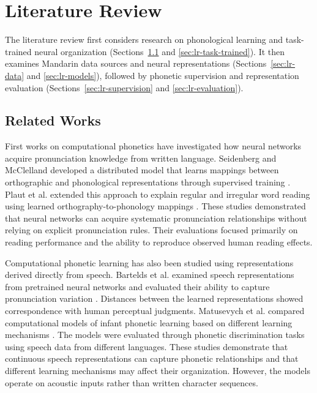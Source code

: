 \section{Literature Review}
\label{sec:literature_review}

The literature review first considers research on phonological learning and
task-trained neural organization (Sections~\ref{sec:related} and
\ref{sec:lr-task-trained}). It then examines Mandarin data sources and neural
representations (Sections~\ref{sec:lr-data} and \ref{sec:lr-models}),
followed by phonetic supervision and representation evaluation
(Sections~\ref{sec:lr-supervision} and \ref{sec:lr-evaluation}).

\subsection{Related Works}
\label{sec:related}

First works on computational phonetics have investigated how neural networks
acquire pronunciation knowledge from written language. Seidenberg and McClelland
developed a distributed model that learns mappings between orthographic and
phonological representations through supervised training
\cite{ref_seidenberg1989}. Plaut et al. extended this approach to explain
regular and irregular word reading using learned orthography-to-phonology
mappings \cite{ref_plaut1996}. These studies demonstrated that neural networks
can acquire systematic pronunciation relationships without relying on explicit
pronunciation rules. Their evaluations focused primarily on reading performance
and the ability to reproduce observed human reading effects.

Computational phonetic learning has also been studied using representations
derived directly from speech. Bartelds et al. examined speech representations
from pretrained neural networks and evaluated their ability to capture
pronunciation variation \cite{ref_bartelds2022}. Distances between the learned
representations showed correspondence with human perceptual judgments.
Matusevych et al. compared computational models of infant phonetic learning
based on different learning mechanisms \cite{ref_matusevych2023}. The models
were evaluated through phonetic discrimination tasks using speech data from
different languages. These studies demonstrate that continuous speech
representations can capture phonetic relationships and that different learning
mechanisms may affect their organization. However, the models operate on
acoustic inputs rather than written character sequences.

